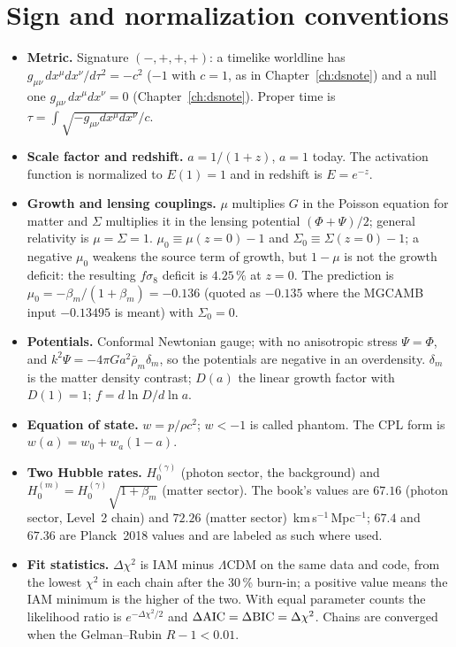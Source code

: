 \section{Sign and normalization conventions}
\begin{itemize}
\item \textbf{Metric.} Signature $(-,+,+,+)$: a timelike worldline has $g_{\mu\nu}\,dx^\mu dx^\nu/d\tau^2=-c^2$ ($-1$ with $c=1$, as in Chapter~\ref{ch:dsnote}) and a null one $g_{\mu\nu}\,dx^\mu dx^\nu=0$
(Chapter~\ref{ch:dsnote}). Proper time is $\tau=\int\sqrt{-g_{\mu\nu}dx^\mu dx^\nu}/c$.
\item \textbf{Scale factor and redshift.} $a=1/(1+z)$, $a=1$ today. The activation function is normalized to $E(1)=1$ and in redshift is $E=e^{-z}$.
\item \textbf{Growth and lensing couplings.} $\mu$ multiplies $G$ in the Poisson equation for matter and $\Sigma$ multiplies it in the lensing potential
$(\Phi+\Psi)/2$; general relativity is $\mu=\Sigma=1$. $\mu_0\equiv\mu(z{=}0)-1$ and $\Sigma_0\equiv\Sigma(z{=}0)-1$; a negative $\mu_0$ weakens the source term of growth, but $1-\mu$ is not the growth deficit: the resulting $f\sigma_8$ deficit is $4.25\,\%$ at $z=0$. The
prediction is $\mu_0=-\beta_m/(1+\beta_m)=-0.136$ (quoted as $-0.135$ where the MGCAMB input $-0.13495$ is meant) with $\Sigma_0=0$.
\item \textbf{Potentials.} Conformal Newtonian gauge; with no anisotropic stress $\Psi=\Phi$, and $k^2\Psi=-4\pi Ga^2\bar\rho_m\delta_m$, so the potentials are
negative in an overdensity. $\delta_m$ is the matter density contrast; $D(a)$ the linear growth factor with $D(1)=1$; $f=d\ln D/d\ln a$.
\item \textbf{Equation of state.} $w=p/\rho c^2$; $w<-1$ is called phantom. The CPL form is $w(a)=w_0+w_a(1-a)$.
\item \textbf{Two Hubble rates.} $H_0^{(\gamma)}$ (photon sector, the background) and $H_0^{(m)}=H_0^{(\gamma)}\sqrt{1+\beta_m}$ (matter sector). The book's values are
$67.16$ (photon sector, Level~2 chain) and $72.26$ (matter sector)~km\,s$^{-1}$\,Mpc$^{-1}$; $67.4$ and $67.36$ are Planck~2018 values and are labeled as such where used.
\item \textbf{Fit statistics.} $\Delta\chi^2$ is IAM minus $\Lambda$CDM on the same data and code, from the lowest $\chi^2$ in each chain after the 30\,\% burn-in; a positive value means the IAM minimum is the higher of the two.
With equal parameter counts the likelihood ratio is $e^{-\Delta\chi^2/2}$ and $\Delta{\rm AIC}=\Delta{\rm BIC}=\Delta\chi^2$. Chains are converged when the Gelman--Rubin $R-1<0.01$.

\end{itemize}
